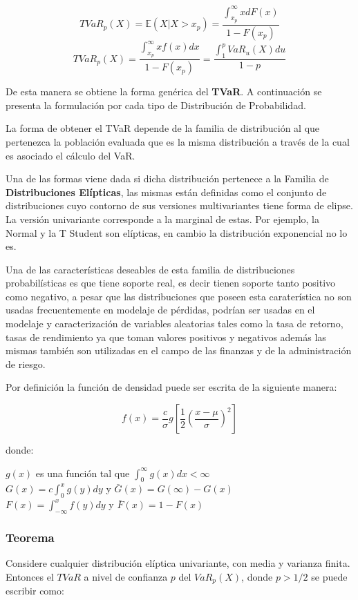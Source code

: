\documentclass[10pt,]{article}
\begin{document}
\[TVaR_p(X)=\mathbb{E}(X|X>x_p)=\frac{\int_{x_p}^{\infty}xdF(x)}{1-F(x_p)}\]
\[TVaR_p(X)=\frac{\int_{x_p}^{\infty}xf(x)dx}{1-F(x_p)}=\frac{\int_{1}^{p}VaR_u(X)du}{1-p}\]

De esta manera se obtiene la forma genérica del \textbf{TVaR}. A
continuación se presenta la formulación por cada tipo de Distribución de
Probabilidad.

La forma de obtener el TVaR depende de la familia de distribución al que
pertenezca la población evaluada que es la misma distribución a través
de la cual es asociado el cálculo del VaR.

Una de las formas viene dada si dicha distribución pertenece a la
Familia de \textbf{Distribuciones Elípticas}, las mismas están definidas
como el conjunto de distribuciones cuyo contorno de sus versiones
multivariantes tiene forma de elipse. La versión univariante corresponde
a la marginal de estas. Por ejemplo, la Normal y la T Student son
elípticas, en cambio la distribución exponencial no lo es.

Una de las características deseables de esta familia de distribuciones
probabilísticas es que tiene soporte real, es decir tienen soporte tanto
positivo como negativo, a pesar que las distribuciones que poseen esta
caraterística no son usadas frecuentemente en modelaje de pérdidas,
podrían ser usadas en el modelaje y caracterización de variables
aleatorias tales como la tasa de retorno, tasas de rendimiento ya que
toman valores positivos y negativos además las mismas también son
utilizadas en el campo de las finanzas y de la administración de riesgo.

Por definición la función de densidad puede ser escrita de la siguiente
manera:

\[f(x)=\frac{c}{\sigma}g\left[\frac{1}{2}\left(\frac{x-\mu}{\sigma}\right)^2\right]\]

donde:

\(g(x)\) es una función tal que \(\int_{0}^{\infty}g(x)dx < \infty\)\\
\(G(x)=c\int_{0}^{x}g(y)dy\) y \(\bar{G}(x)=G(\infty)-G(x)\)\\
\(F(x)=\int_{-\infty}^{x}f(y)dy\) y \(\bar{F}(x)=1-F(x)\)

\hypertarget{teorema}{%
\subsubsection{Teorema}\label{teorema}}

Considere cualquier distribución elíptica univariante, con media y
varianza finita. Entonces el \(TVaR\) a nivel de confianza \(p\) del
\(VaR_p(X)\), donde \(p > 1/2\) se puede escribir como:
\end{document}
